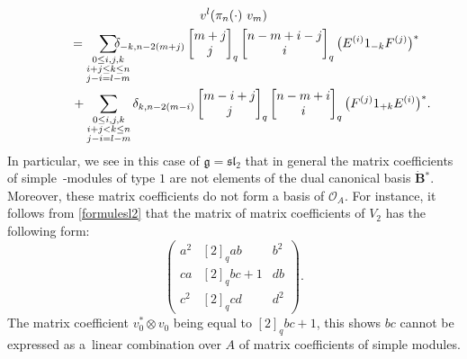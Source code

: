 \documentclass[10pt,a4paper]{amsart}
\numberwithin{equation}{section}
\theoremstyle{definition}
\newcommand{\Oo}{{\mathcal O}}
\begin{document}
\begin{gather}
v^l(\pi_n( \cdot) \ v_m)\nonumber\\
\qquad= \sum_{\substack{0\leq i,j,k\\ i+j\leq k\leq n\\j-i=l-m}} \hspace*{-0.5cm}\delta_{-k,n-2(m+j)} \left[\begin{matrix} m+j \\ j \end{matrix}\right]_{q} \left[\begin{matrix}n-m+i-j \\ i \end{matrix}\right]_{q}\big(E^{(i)}1_{-k}F^{(j)}\big)^*\nonumber\\
\phantom{\qquad=}{} + \sum_{\substack{0\leq i,j,k\\ i+j< k\leq n
\\j-i=l-m}}\delta_{k,n-2(m-i)} \left[\begin{matrix} m-i+j \\ j \end{matrix}\right]_{q} \left[\begin{matrix} n-m+i \\ i \end{matrix}\right]_{q}\big(F^{(j)}1_{+k}E^{(i)}\big)^*.\label{formulesl2}
\end{gather}
In particular, we see in this case of $\mathfrak{g}={\mathfrak{sl}_2}$ that in general the matrix coefficients of simple~-modules of type $1$ are not elements of the dual canonical basis $\dot{\mathbf{B}} {}^*$. Moreover, these matrix coefficients do not form a basis of $\Oo_A$. For instance, it follows from \eqref{formulesl2} that the matrix of matrix coefficients of $V_2$ has the following form:
\begin{equation}\label{matrixcoefV2}
\begin{pmatrix}a^2 & [2]_qab & b^2 \\ ca & [2]_qbc +1 & db \\ c^2 & [2]_q cd & d^2 \end{pmatrix}.
\end{equation}
The matrix coefficient $v_0^* \otimes v_0$ being equal to $[2]_qbc +1$, this shows $bc$ cannot be expressed as a~linear combination over $A$ of matrix coefficients of simple modules.
\end{document}

